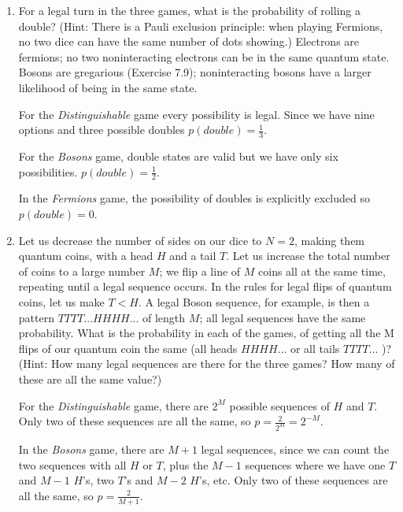 \begin{enumerate}
\begin{enumerate}
Thus, 
$$
|a,a> = -|a,a>
$$

and $|a,a> = 0 $. Two fermions cannot occupy the same quantum state. In our \textit{Fermions} game, this is represented as the strict $b>a$ condition. Since we only have three possible options, $p(5) = \frac{1}{3}$.


\item For a legal turn in the three games, what is
the probability of rolling a double? (Hint: There
is a Pauli exclusion principle: when playing Fermions,
no two dice can have the same number
of dots showing.) Electrons are fermions; no
two noninteracting electrons can be in the same
quantum state. Bosons are gregarious (Exercise
7.9); noninteracting bosons have a larger
likelihood of being in the same state.

For the \textit{Distinguishable} game every possibility is legal. Since we have nine options and three possible doubles $p(double) = \frac{1}{3}$.


For the \textit{Bosons} game, double states are valid but we have only six possibilities. $p(double) = \frac{1}{2}$.

In the \textit{Fermions} game, the possibility of doubles is explicitly excluded so $p(double) = 0$.




\item Let us decrease the number of sides on our dice to $N=2$, making them quantum coins, with a head $H$ and a tail $T$. Let us increase the total number of coins to a large number $M$; we flip a line of $M$ coins all at the same time, repeating until a legal sequence occurs. In the rules for legal flips of quantum coins, let us make $T < H$. A legal Boson sequence, for example, is then a pattern $TTTT...HHHH...$ of length $M$; all legal sequences have the same probability. What is the probability in each of the games, of getting all the M flips of our quantum coin the same (all heads $HHHH...$ or all tails $TTTT...$ )? (Hint: How many legal sequences are there for the three games? How many of these are all the same value?)


For the \textit{Distinguishable} game, there are $2^M$ possible sequences of $H$ and $T$. Only two of these sequences are all the same, so $p = \frac{2}{2^M} = 2^{-M}$.

In the \textit{Bosons} game, there are $M+1$ legal sequences, since we can count the two sequences with all $H$ or $T$, plus the $M-1$ sequences where we have one $T$ and $M-1$ $H$'s, two $T$'s and $M-2$ $H$'s, etc. Only two of these sequences are all the same, so $p = \frac{2}{M+1}$.


\end{enumerate}
\end{enumerate}
